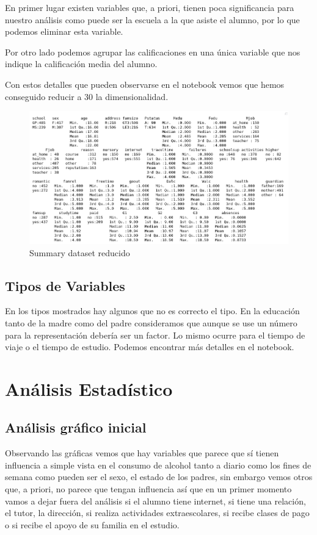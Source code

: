 \documentclass[12pt,a4paper]{article}
\begin{document}
En primer lugar existen variables que, a priori, tienen poca significancia para nuestro análisis como puede ser la escuela a la que asiste el alumno, por lo que podemos eliminar esta variable. 

Por otro lado podemos agrupar las calificaciones en una única variable que nos indique la calificación media del alumno. 

Con estos detalles que pueden observarse en el notebook vemos que hemos conseguido reducir a 30 la dimensionalidad.


\begin{figure}[ht!]
\centering
\includegraphics[trim = 0mm 0mm 0mm 0mm, clip,scale=0.4]{images/summary_nonas}
\caption{Summary dataset reducido}
\label{fig:sum3}
\end{figure}






\subsection{Tipos de Variables}
En los tipos mostrados hay algunos que no es correcto el tipo. En la educación tanto de la madre como del padre consideramos que aunque se use un número para la representación debería ser un factor. Lo mismo ocurre para el tiempo de viaje o el tiempo de estudio.  Podemos encontrar más detalles en el notebook. 

\section{Análisis Estadístico}
\subsection{Análisis gráfico inicial}
Observando las gráficas vemos que hay variables que parece que sí tienen influencia a simple vista en el consumo de alcohol tanto a diario como los fines de semana como pueden ser el sexo, el estado de los padres, sin embargo vemos otros que, a priori, no parece que tengan influencia así que en un primer momento vamos a dejar fuera del análisis si el alumno tiene internet, si tiene una relación, el tutor, la dirección, si realiza actividades extraescolares, si recibe clases de pago o si  recibe el apoyo de su familia en el estudio. 
\end{document}
